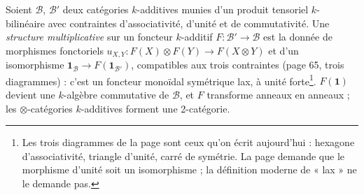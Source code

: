 \documentclass[11pt,a4paper]{article}
\begin{document}
Soient $\mathcal{B}$, $\mathcal{B}'$ deux catégories $k$-additives munies d'un
produit tensoriel $k$-bilinéaire avec contraintes d'associativité, d'unité et
de commutativité. Une \emph{structure multiplicative} sur un foncteur
$k$-additif $F : \mathcal{B}' \to \mathcal{B}$ est la donnée de morphismes
fonctoriels $u_{X,Y} : F(X) \otimes F(Y) \to F(X \otimes Y)$ et d'un
isomorphisme $\mathbf{1}_{\mathcal{B}} \to F(\mathbf{1}_{\mathcal{B}'})$,
compatibles aux trois contraintes (page 65, trois diagrammes) : c'est un
foncteur monoïdal symétrique lax, à unité forte\footnote{Les trois
diagrammes de la page sont ceux qu'on écrit aujourd'hui : hexagone
d'associativité, triangle d'unité, carré de symétrie. La page demande que
le morphisme d'unité soit un isomorphisme ; la définition moderne de
« lax » ne le demande pas.}. $F(\mathbf{1})$ devient une $k$-algèbre
commutative de $\mathcal{B}$, et $F$ transforme anneaux en anneaux ; les
$\otimes$-catégories $k$-additives forment une 2-catégorie.
\end{document}
